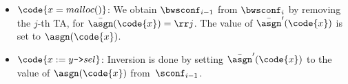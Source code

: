 \begin{itemize}
  \item $\code{x = malloc()}$: We obtain $\bwsconf_{i-1}$ from $\bwsconf_{i}$
    by removing the $j$-th TA, for $\bar\asgn(\code{x}) = \rr j$.
    The value of $\bar\asgn'(\code{x})$ is set to $\asgn(\code{x})$.

  \item $\code{x := y\text{\texttt{->}}sel}$:
Inversion is done by setting $\bar\asgn'(\code{x})$ to the value of
$\asgn(\code{x})$ from~$\sconf_{i-1}$.
%


\end{itemize}

